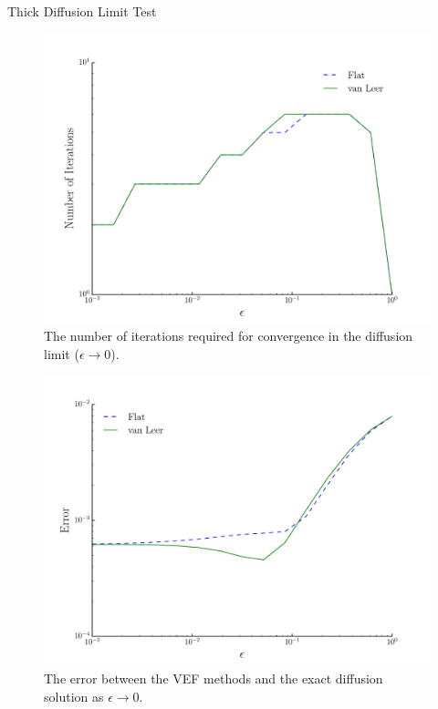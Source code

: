 \documentclass[10pt]{beamer}
\begin{document}
\begin{frame}{Thick Diffusion Limit Test}

	\begin{figure}[htb]
		\centering
		\includegraphics[height=.3\textheight]{figs/dl_it.pdf}
		\caption{The number of iterations required for convergence in the diffusion limit ($\epsilon \rightarrow 0$). }
		\label{fig:dl_it}
	\end{figure}
	\begin{figure}
		\centering
		\includegraphics[height=.3\textheight]{figs/dl_err.pdf}
		\caption{The error between the VEF methods and the exact diffusion solution as $\epsilon \rightarrow 0$. }
		\label{fig:dl_err}
	\end{figure}

\end{frame}
\end{document}
